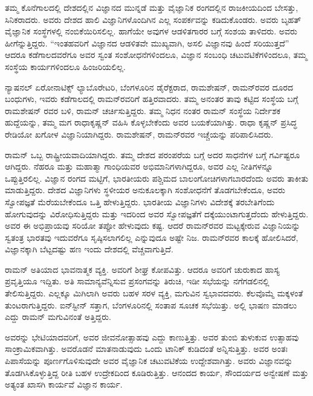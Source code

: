 ತಮ್ಮ ಕೊನೆಗಾಲದಲ್ಲಿ ದೇಶದಲ್ಲಿನ ವಿಜ್ಞಾನದ ಮುನ್ನಡೆ ಮತ್ತು ವೈಜ್ಞಾನಿಕ ರಂಗದಲ್ಲಿನ ರಾಜಕೀಯದಿಂದ ಬೇಸತ್ತು, ಸಿನಿಕರಾದರು. ಅವರು ದೇಶದ ಹಾಲಿ ವಿಜ್ಞಾನಿಗಳೊಂದಿಗಿನ ಎಲ್ಲ ಸಂಪರ್ಕವನ್ನು ಕಡಿದುಕೊಂಡರು. ಅವರು ಬೃಹತ್ ವೈಜ್ಞಾನಿಕ ಸಂಸ್ಥೆಗಳಲ್ಲಿ ನಂಬಿಕೆಯಿರಿಸಲಿಲ್ಲ. ಹಾಗೆಯೇ ಅವುಗಳ ಆಡಳಿತಗಾರರ ಬಗ್ಗೆ ಸಂಶಯ ತಾಳಿದರು. ಅವರು ಹೀಗೆನ್ನುತ್ತಿದ್ದರು. \enginline{-}“ಇಂತಹವರಿಗೆ ವಿಜ್ಞಾನದ ಆಡಳಿತವೇ ಮುಖ್ಯವಾಗಿ, ಅಸಲಿ ವಿಜ್ಞಾನವು ಹಿಂದೆ ಸರಿಯುತ್ತದೆ” ಆದರೂ ಕಡೆಗಾಲದವರೆಗೂ ಅವರ ಸ್ವಂತ ಸಂಶೋಧನೆಗಳಿಂದಲೂ, ವಿಜ್ಞಾನ ಸಂಬಂಧಿ ಚಟುವಟಿಕೆಗಳಿಂದಲೂ, ತಮ್ಮ ಸಂಸ್ಥೆಯ ಕಾರ್ಯಗಳಿಂದಲೂ ಹಿಂಜರಿಯಲಿಲ್ಲ.

ನ್ಯಾಷನಲ್ ಏರೋನಾಟಿಕ್ಸ್ ಲ್ಯಾಬೊರೇಟರಿ, ಬೆಂಗಳೂರಿನ ಡೈರೆಕ್ಟರಾದ, ರಾಮಶೇಷನ್, ರಾಮನ್‍ರವರ ದೂರದ ಬಂಧುಗಳು, ಇವರು ಕಡೆಗಾಲದಲ್ಲಿ ರಾಮನ್‍ರವರಿಗೆ ಹತ್ತಿರವಾದರು. ತಮ್ಮ ಅನಂತರ ತಾವು ಕಟ್ಟಿದ ಸಂಸ್ಥೆಯ ಬಗ್ಗೆ ರಾಮಶೇಷನ್ ರವರ ಬಳಿ, ರಾಮನ್ ಚರ್ಚಿಸುತ್ತಿದ್ದರು. ತಮ್ಮ ನಿಧನ ನಂತರ ರಾಮನ್ ಸಂಸ್ಥೆಯ ನಿರ್ದೇಶಕ ಹುದ್ದೆಯನ್ನು, ತಮ್ಮ ಮಗ ರಾಧಾಕೃಷ್ಣನ್ ವಹಿಸಿ ಕೊಳ್ಳಬೇಕೆಂದು ಅವರ ಬಯಕೆಯಾಗಿತ್ತು. ರಾಧಾ ಕೃಷ್ಣನ್ ಪ್ರಸಿದ್ಧ ರೇಡಿಯೋ ಖಗೋಳ ವಿಜ್ಞಾನಿಯಾಗಿದ್ದರು. ರಾಮಶೇಷನ್, ರಾಮನ್‍ರವರ ಇಚ್ಚೆಯನ್ನು ಪರಿಪಾಲಿಸಿದರು.

\vskip 2pt

ರಾಮನ್ ಒಬ್ಬ ರಾಷ್ಟ್ರೀಯವಾದಿಯಾಗಿದ್ದರು. ತಮ್ಮ ದೇಶದ ಪರಂಪರೆಯ ಬಗ್ಗೆ ಅದರ ಸಾಧನೆಗಳ ಬಗ್ಗೆ ಗರ್ವಿಷ್ಟರೂ ಆಗಿದ್ದರು. ನೆಹರೂ ಮತ್ತು ಮಹಾತ್ಮಾ ಗಾಂಧಿಯವರ ಅಭಿಮಾನಿ\-ಗಳಾಗಿದ್ದರೂ, ಅವರ ಎಲ್ಲ ನೀತಿಗಳನ್ನೂ ಒಪ್ಪುತ್ತಿರಲಿಲ್ಲ. ವಿಜ್ಞಾನ ರಂಗದ ಮಟ್ಟಿಗೆ, ಭಾರತೀಯರು ಪಶ್ಚಿಮದ ಬಾಲಂಗೋಚಿಗಳಾಗಬಾರದೆಂದು ಅವರು ತಾಕೀತು ಮಾಡುತ್ತಿದ್ದರು. ದೇಶದ ವಿಜ್ಞಾನಿಗಳು ಸ್ಥಳೀಯರ ಅನುಕೂಲಕ್ಕಾಗಿ ಸಂಶೋಧನೆಗೆ ತೊಡಗಬೇಕೆಂದೂ, ಅವರು ಸ್ವೋಪಜ್ಞತೆ ಮೆರೆಯ\-ಬೇಕೆಂದೂ ಒತ್ತಿ ಹೇಳುತ್ತಿದ್ದರು. ಭಾರತೀಯ ವಿಜ್ಞಾನಿಗಳು ವಿದೇಶಕ್ಕೆ ತರಬೇತಿಗೆಂದು ಹೋಗುವುದನ್ನು ವಿರೋಧಿಸುತ್ತಿದ್ದರು ಮತ್ತು ಇದರಿಂದ ಅವರ ಸ್ವೋಪಜ್ಞತೆಗೆ ದಕ್ಕೆಯುಂಟಾಗುತ್ತದೆಂದು ಹೇಳುತ್ತಿದ್ದರು. ಅವರ ಈ ಅಭಿಪ್ರಾಯವು ಸರಿಯೋ ತಪ್ಪೋ ಹೇಳುವುದು ಕಷ್ಟ. ಆದರೆ ರಾಮನ್‍ರವರ ಮಟ್ಟಕ್ಕೇರುವ ವಿಜ್ಞಾನಿಯನ್ನು ಸ್ವತಂತ್ರ ಭಾರತವು ಇದುವರೆಗೂ ಸೃಷ್ಠಿಸಲಾಗಲಿಲ್ಲ ಎನ್ನುವುದೂ ಅಷ್ಟೇ ನಿಜ. ರಾಮನ್‍ರವರ ಕಾಲಕ್ಕೆ ಹೋಲಿಸಿದರೆ, ವಿಜ್ಞಾನಕ್ಕಾಗಿ ಬೆಟ್ಟದಷ್ಟು ಹಣ ಇಂದು ದೇಶದಲ್ಲಿ ವೆಚ್ಚವಾಗುತ್ತಿದೆ.

\vskip 2pt

ರಾಮನ್ ಅತಿಯಾದ ಭಾವನಾತ್ಮಕ ವ್ಯಕ್ತಿ. ಅವರಿಗೆ ಶೀಘ್ರ ಕೋಪವಿತ್ತು. ಆದರೂ ಅವರಿಗೆ ಚುರುಕಾದ ಹಾಸ್ಯ ಪ್ರವೃತ್ತಿಯೂ ಇದ್ದಿತು. ಅತಿ ಸಾಮಾನ್ಯವೆನ್ನಿಸುವ ಪ್ರಸಂಗವನ್ನು ತಿರುಚಿ, ಇಡೀ ಸಭೆಯನ್ನು ನಗೆಗಡಲಿನಲ್ಲಿ ತೇಲಿಸುತ್ತಿದ್ದರು. ಎಲ್ಲಕ್ಕೂ ಮಿಗಿಲಾಗಿ ಅವರು ಬಹಳ ಸರಳ ವ್ಯಕ್ತಿ, ಮಗುವಿನ ಸ್ವಭಾವದವರು. ಕೆಲವೊಮ್ಮೆ ಮಕ್ಕಳಂತೆ ತುಂಟರಾಗುತ್ತಿದ್ದರು. ಐನ್‍ಸ್ಟೀನ್ ಸತ್ತಾಗ, ಬೆಂಗಳೂರಿನಲ್ಲಿ ಸಂತಾಪ ಸೂಚಕ ಸಭೆಯಿತ್ತು. ಅಲ್ಲಿ ಭಾಷಣ ಮಾಡಲು ಎದ್ದು ರಾಮನ್ ಮಗುವಿ\-ನಂತೆ ಅತ್ತಿದ್ದರು.

\vskip 2pt

ಅವರನ್ನು ಭೇಟಿಯಾದವರಿಗೆ, ಅವರ ಜೀವನೋತ್ಸಾಹವು ಎದ್ದು ಕಾಣುತ್ತಿತ್ತು. ಅವರ ತುಂಬಿ ತುಳುಕುವ ಉತ್ಸಾಹವು ಸಾಂಕ್ರಾಮಿಕವಾಗಿತ್ತು. ಅವರೊಡನೆ ಮಾತನಾಡುವುದು ಒಂದು ಟಾನಿಕ್ ಕುಡಿದಂತೆ ಅನ್ನಿಸುತ್ತಿತ್ತು. ಅವರ ಅಂತಃ ಪಿಪಾಸೆಯನ್ನು ಪೂರ್ಣಗೊಳಿಸುವುದೇ ಅವರ ವೈಜ್ಞಾನಿಕ ಚಟುವಟಿಕೆಯ ಉದ್ದೇಶವಾಗಿತ್ತು. ಅವರು ವಿಜ್ಞಾನವನ್ನು ತೊಡಗಿಸಿಕೊಳ್ಳುತ್ತಿದ್ದ ರೀತಿ ಬಹಳ ಉದ್ರೇಕದಿಂದ ಕೂಡಿರುತ್ತಿತ್ತು. ಆನಂದದ ಕಾರ್ಯ, ಸೌಂದರ್ಯದ ಅನ್ವೇಷಣೆ ಮತ್ತು ಅತ್ಯಂತ ಖಾಸಗಿ ಕಾರ್ಯವೆ ವಿಜ್ಞಾನ ಕಾರ್ಯ.

